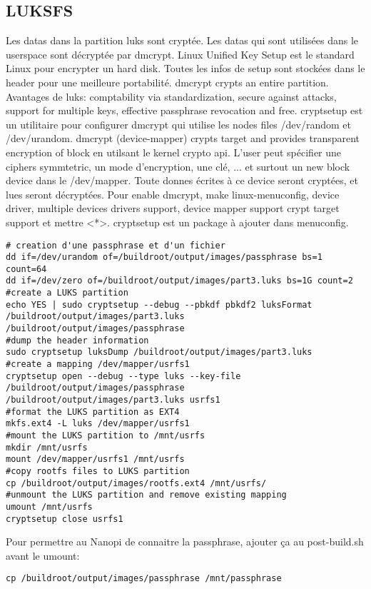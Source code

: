 \subsection{LUKSFS}
Les datas dans la partition luks sont cryptée. Les datas qui sont utilisées dans le userspace sont décryptée par dmcrypt. Linux Unified Key Setup est le standard Linux pour encrypter un hard disk. Toutes les infos de setup sont stockées dans le header pour une meilleure portabilité. dmcrypt crypts an entire partition. Avantages de luks: comptability via standardization, secure against attacks, support for multiple keys, effective passphrase revocation and free. cryptsetup est un utilitaire pour configurer dmcrypt qui utilise les nodes files /dev/random et /dev/urandom. dmcrypt (device-mapper) crypts target and provides transparent encryption of block en utilsant le kernel crypto api. L'user peut spécifier une ciphers symmtetric, un mode d'encryption, une clé, ... et surtout un new block device dans le /dev/mapper. Toute donnes écrites à ce device seront cryptées, et lues seront décryptées. Pour enable dmcrypt, make linux-menuconfig, device driver, multiple devices drivers support, device mapper support crypt target support et mettre <*>. cryptsetup est un package à ajouter dans menuconfig.
\begin{Verbatim}[breaklines=true, breakanywhere=true]
# creation d'une passphrase et d'un fichier
dd if=/dev/urandom of=/buildroot/output/images/passphrase bs=1 count=64
dd if=/dev/zero of=/buildroot/output/images/part3.luks bs=1G count=2
#create a LUKS partition
echo YES | sudo cryptsetup --debug --pbkdf pbkdf2 luksFormat
/buildroot/output/images/part3.luks /buildroot/output/images/passphrase
#dump the header information
sudo cryptsetup luksDump /buildroot/output/images/part3.luks
#create a mapping /dev/mapper/usrfs1
cryptsetup open --debug --type luks --key-file
/buildroot/output/images/passphrase /buildroot/output/images/part3.luks usrfs1
#format the LUKS partition as EXT4
mkfs.ext4 -L luks /dev/mapper/usrfs1
#mount the LUKS partition to /mnt/usrfs
mkdir /mnt/usrfs
mount /dev/mapper/usrfs1 /mnt/usrfs
#copy rootfs files to LUKS partition
cp /buildroot/output/images/rootfs.ext4 /mnt/usrfs/
#unmount the LUKS partition and remove existing mapping
umount /mnt/usrfs
cryptsetup close usrfs1
\end{Verbatim}
Pour permettre au Nanopi de connaitre la passphrase, ajouter ça au post-build.sh avant le umount: 
\begin{Verbatim}[breaklines=true, breakanywhere=true]
cp /buildroot/output/images/passphrase /mnt/passphrase
\end{Verbatim}
